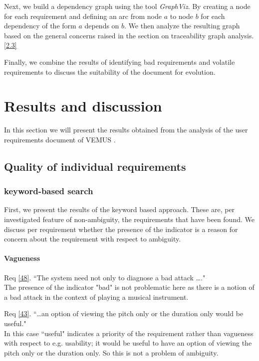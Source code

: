 \documentclass[a4paper,twoside, twocolumn,11pt]{article}
\numberwithin{equation}{section}
\begin{document}
Next, we build a dependency graph using the tool \textit{GraphViz}. By creating a node for each requirement and defining an arc from node $a$ to node $b$ for each dependency of the form $a$ depends on $b$. We then analyze the resulting graph based on the general concerns raised in the section on traceability graph analysis. \ref{2.3}

Finally, we combine the results of identifying bad requirements and volatile requirements to discuss the suitability of the document for evolution. 


\section{Results and discussion}
In this section we will present the results obtained from the analysis of the user requirements document of VEMUS \cite{VEMUS}.

\subsection{Quality of individual requirements}
\subsubsection{keyword-based search}
First, we present the results of the keyword based approach. These are, per investigated feature of non-ambiguity, the requirements that have been found. We discuss per requirement whether the presence of the indicator is a reason for concern about the requirement with respect to ambiguity.
\paragraph{Vagueness} 
Req \ref{48}. ``The system need not only to diagnose a bad attack \ldots." \\
The presence of the indicator "bad" is not problematic here as there is a notion of a bad attack in the context of playing a musical instrument.

Req \ref{43}. ``\ldots an option of viewing the pitch only or the duration only would be useful."\\  In this case ``useful" indicates a priority of the requirement rather than vagueness with respect to e.g. usability; it would be useful to have an option of viewing the pitch only or the duration only. So this is not a problem of ambiguity.
\end{document}
